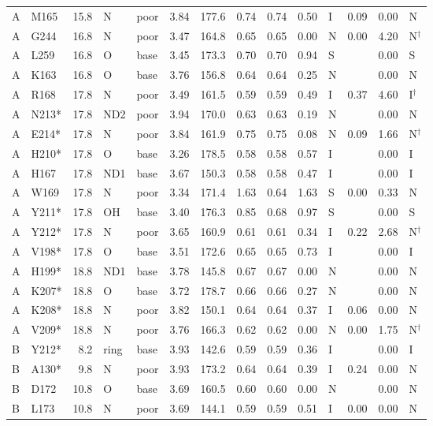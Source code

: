 \documentclass[journal=jcisd8,manuscript=suppinfo]{achemso}
\begin{document}
\begin{singlespace}
{\begin{longtable}{llrllrrrrrlrrl}
A & M165 & 15.8 & N & poor & 3.84 & 177.6 & 0.74 & 0.74 & 0.50 & I & 0.09 & 0.00 & N\\
A & G244 & 16.8 & N & poor & 3.47 & 164.8 & 0.65 & 0.65 & 0.00 & N & 0.00 & 4.20 & N$^\dagger$\\
A & L259 & 16.8 & O & base & 3.45 & 173.3 & 0.70 & 0.70 & 0.94 & S &  & 0.00 & S\\
A & K163 & 16.8 & O & base & 3.76 & 156.8 & 0.64 & 0.64 & 0.25 & N &  & 0.00 & N\\
A & R168 & 17.8 & N & poor & 3.49 & 161.5 & 0.59 & 0.59 & 0.49 & I & 0.37 & 4.60 & I$^\dagger$\\
A & N213* & 17.8 & ND2 & poor & 3.94 & 170.0 & 0.63 & 0.63 & 0.19 & N &  & 0.00 & N\\
A & E214* & 17.8 & N & poor & 3.84 & 161.9 & 0.75 & 0.75 & 0.08 & N & 0.09 & 1.66 & N$^\dagger$\\
A & H210* & 17.8 & O & base & 3.26 & 178.5 & 0.58 & 0.58 & 0.57 & I &  & 0.00 & I\\
A & H167 & 17.8 & ND1 & base & 3.67 & 150.3 & 0.58 & 0.58 & 0.47 & I &  & 0.00 & I\\
A & W169 & 17.8 & N & poor & 3.34 & 171.4 & 1.63 & 0.64 & 1.63 & S & 0.00 & 0.33 & N\\
A & Y211* & 17.8 & OH & base & 3.40 & 176.3 & 0.85 & 0.68 & 0.97 & S &  & 0.00 & S\\
A & Y212* & 17.8 & N & poor & 3.65 & 160.9 & 0.61 & 0.61 & 0.34 & I & 0.22 & 2.68 & N$^\dagger$\\
A & V198* & 17.8 & O & base & 3.51 & 172.6 & 0.65 & 0.65 & 0.73 & I &  & 0.00 & I\\
A & H199* & 18.8 & ND1 & base & 3.78 & 145.8 & 0.67 & 0.67 & 0.00 & N &  & 0.00 & N\\
A & K207* & 18.8 & O & base & 3.72 & 178.7 & 0.66 & 0.66 & 0.27 & N &  & 0.00 & N\\
A & K208* & 18.8 & N & poor & 3.82 & 150.1 & 0.64 & 0.64 & 0.37 & I & 0.06 & 0.00 & N\\
A & V209* & 18.8 & N & poor & 3.76 & 166.3 & 0.62 & 0.62 & 0.00 & N & 0.00 & 1.75 & N$^\dagger$\\
B & Y212* & 8.2 & ring & base & 3.93 & 142.6 & 0.59 & 0.59 & 0.36 & I &  & 0.00 & I\\
B & A130* & 9.8 & N & poor & 3.93 & 173.2 & 0.64 & 0.64 & 0.39 & I & 0.24 & 0.00 & N\\
B & D172 & 10.8 & O & base & 3.69 & 160.5 & 0.60 & 0.60 & 0.00 & N &  & 0.00 & N\\
B & L173 & 10.8 & N & poor & 3.69 & 144.1 & 0.59 & 0.59 & 0.51 & I & 0.00 & 0.00 & N\\

\end{longtable}}
\end{singlespace}
\end{document}
